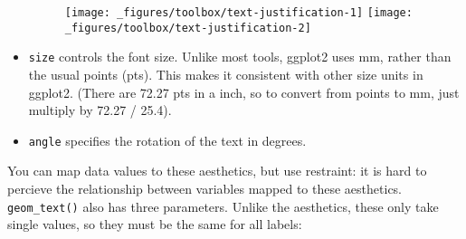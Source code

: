 \begin{itemize}
\begin{Shaded}
\begin{Highlighting}[]
\StringTok{ }\NormalTok{(}
   \NormalTok{(}\NormalTok{, }\NormalTok{, }\NormalTok{, }\NormalTok{, }\NormalTok{),}
   \NormalTok{(}\NormalTok{, }\NormalTok{, }\NormalTok{, }\NormalTok{, }\NormalTok{),}
   \NormalTok{(}
    \NormalTok{, }\NormalTok{, }
    \NormalTok{, }\NormalTok{, }
  \NormalTok{)}
\NormalTok{)}
\StringTok{  }\NormalTok{(}\NormalTok{(} 
\StringTok{  }\NormalTok{(}\NormalTok{(}  \NormalTok{, } \NormalTok{)}
\end{Highlighting}
\end{Shaded}

  \begin{figure}[H]
    \texttt{[image: \_figures/toolbox/text-justification-1]}%
    \texttt{[image: \_figures/toolbox/text-justification-2]}
  \end{figure}
\item
  \texttt{size} controls the font size. Unlike most tools, ggplot2 uses
  mm, rather than the usual points (pts). This makes it consistent with
  other size units in ggplot2. (There are 72.27 pts in a inch, so to
  convert from points to mm, just multiply by 72.27 / 25.4).
\item
  \texttt{angle} specifies the rotation of the text in degrees.
\end{itemize}

You can map data values to these aesthetics, but use restraint: it is
hard to percieve the relationship between variables mapped to these
aesthetics. \texttt{geom\_text()} also has three parameters. Unlike the
aesthetics, these only take single values, so they must be the same for
all labels:

